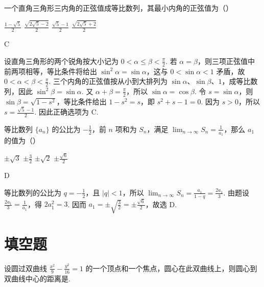 \documentclass[UTF8,a4paper,oneside,11pt]{ctexbook}
\begin{document}
\begin{problem}
一个直角三角形三内角的正弦值成等比数列，其最小内角的正弦值为（\quad）

\choices
    {\(\frac{1-\sqrt{5}}{2}\)}
    {\(\frac{\sqrt{2\sqrt{5}-2}}{2}\)}
    {\(\frac{\sqrt{5}-1}{2}\)}
    {\(\frac{\sqrt{2\sqrt{5}+2}}{2}\)}
\end{problem}

\begin{answer}
C
\end{answer}

\begin{solution}
设直角三角形的两个锐角按大小记为 \(0<\alpha\leqslant\beta<\frac{\pi}{2}\). 若 \(\alpha=\beta\)，则三项正弦值中前两项相等，等比条件将给出 \(\sin^2\alpha=\sin\alpha\)，这与 \(0<\sin\alpha<1\) 矛盾，故 \(0<\alpha<\beta<\frac{\pi}{2}\). 三个内角的正弦值按从小到大排列为 \(\sin\alpha\)、\(\sin\beta\)、\(1\)，成等比数列，因此 \(\sin^2\beta=\sin\alpha\). 又 \(\alpha+\beta=\frac{\pi}{2}\)，所以 \(\sin\alpha=\cos\beta\). 令 \(s=\sin\alpha\)，则 \(\sin\beta=\sqrt{1-s^2}\)，等比条件给出 \(1-s^2=s\)，即 \(s^2+s-1=0\). 因为 \(s>0\)，所以 \(s=\frac{\sqrt{5}-1}{2}\). 因此正确选项为 C.
\end{solution}

\begin{problem}
等比数列 \(\{a_{n}\}\) 的公比为 \(-\frac{1}{2}\)，前 \(n\) 项和为 \(S_{n}\)，满足 \(\displaystyle\lim_{n\to \infty} S_n = \frac{1}{a_1}\)，那么 \(a_1\) 的值为（\quad）

\choices
    {\(\pm \sqrt{3}\)}
    {\(\pm \frac{3}{2}\)}
    {\(\pm\sqrt{2}\)}
    {\(\pm \frac{\sqrt{6}}{2}\)}
\end{problem}

\begin{answer}
D
\end{answer}

\begin{solution}
等比数列的公比为 \(q=-\frac{1}{2}\)，且 \(|q|<1\)，所以
\(\displaystyle\lim_{n\to\infty}S_n=\frac{a_1}{1-q}=\frac{2a_1}{3}\). 由题设
\(\frac{2a_1}{3}=\frac{1}{a_1}\)，得 \(2a_1^2=3\). 因而
\(a_1=\pm\sqrt{\frac{3}{2}}=\pm\frac{\sqrt{6}}{2}\)，故选 D.
\end{solution}

\section{填空题}

\begin{problem}
设圆过双曲线 \(\frac{x^{2}}{9} - \frac{y^{2}}{16} = 1\) 的一个顶点和一个焦点，圆心在此双曲线上，则圆心到双曲线中心的距离是\fillinblank{}.
\end{problem}
\end{document}

